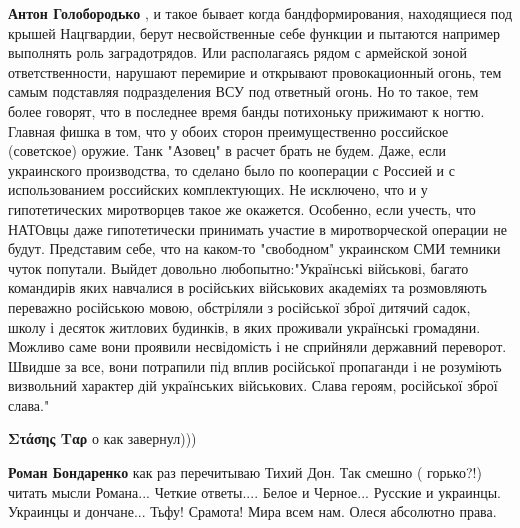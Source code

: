 \begin{itemize}
\begin{itemize}
\textbf{Антон Голобородько} , и такое бывает когда бандформирования,
находящиеся под крышей Нацгвардии, берут несвойственные себе функции и пытаются
например выполнять роль заградотрядов. Или располагаясь рядом с армейской зоной
ответственности, нарушают перемирие и открывают провокационный огонь, тем самым
подставляя подразделения ВСУ под ответный огонь. Но то такое, тем более
говорят, что в последнее время банды потихоньку прижимают к ногтю. Главная
фишка в том, что у обоих сторон преимущественно российское (советское) оружие.
Танк "Азовец" в расчет брать не будем. Даже, если украинского производства, то
сделано было по кооперации с Россией и с использованием российских
комплектующих. Не исключено, что и у гипотетических миротворцев такое же
окажется. Особенно, если учесть, что НАТОвцы даже гипотетически принимать
участие в миротворческой операции не будут. Представим себе, что на каком-то
"свободном" украинском СМИ темники чуток попутали. Выйдет довольно
любопытно:"Українські військові, багато командирів яких навчалися в російських
військових академіях та розмовляють переважно російською мовою, обстріляли з
російської зброї дитячий садок, школу і десяток житлових будинків, в яких
проживали українські громадяни. Можливо саме вони проявили несвідомість і не
сприйняли державний переворот. Швидше за все, вони потрапили під вплив
російської пропаганди і не розуміють визвольний характер дій українських
військових. Слава героям, російської зброї слава."\Smiley[1.0][yellow]

 
\textbf{Στάσης Ταρ} о как завернул)))

 
\textbf{Роман Бондаренко} как раз перечитываю Тихий Дон. Так смешно ( горько?!)
читать мысли Романа... Четкие ответы.... Белое и Черное... Русские и украинцы.
Украинцы и дончане... Тьфу! Срамота! Мира всем нам. Олеся абсолютно права.

\end{itemize}

 


\end{itemize}
